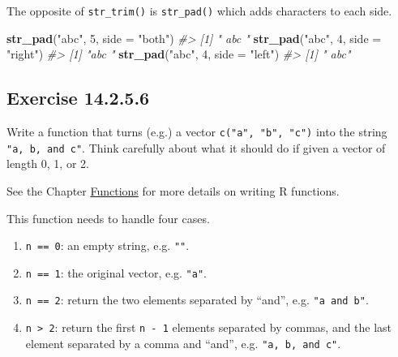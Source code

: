 \documentclass[]{book}
\newenvironment{Shaded}{\begin{snugshade}}{\end{snugshade}}
\newcommand{\CommentTok}[1]{\textcolor[rgb]{0.56,0.35,0.01}{\textit{#1}}}
\newcommand{\DataTypeTok}[1]{\textcolor[rgb]{0.13,0.29,0.53}{#1}}
\newcommand{\DecValTok}[1]{\textcolor[rgb]{0.00,0.00,0.81}{#1}}
\newcommand{\KeywordTok}[1]{\textcolor[rgb]{0.13,0.29,0.53}{\textbf{#1}}}
\newcommand{\NormalTok}[1]{#1}
\newcommand{\StringTok}[1]{\textcolor[rgb]{0.31,0.60,0.02}{#1}}
\providecommand{\tightlist}{%
  \setlength{\itemsep}{0pt}\setlength{\parskip}{0pt}}
\theoremstyle{plain}
\theoremstyle{remark}
\begin{document}
The opposite of \texttt{str\_trim()} is \texttt{str\_pad()} which adds
characters to each side.

\begin{Shaded}
\begin{Highlighting}[]
\KeywordTok{str_pad}\NormalTok{(}\StringTok{"abc"}\NormalTok{, }\DecValTok{5}\NormalTok{, }\DataTypeTok{side =} \StringTok{"both"}\NormalTok{)}
\CommentTok{#> [1] " abc "}
\KeywordTok{str_pad}\NormalTok{(}\StringTok{"abc"}\NormalTok{, }\DecValTok{4}\NormalTok{, }\DataTypeTok{side =} \StringTok{"right"}\NormalTok{)}
\CommentTok{#> [1] "abc "}
\KeywordTok{str_pad}\NormalTok{(}\StringTok{"abc"}\NormalTok{, }\DecValTok{4}\NormalTok{, }\DataTypeTok{side =} \StringTok{"left"}\NormalTok{)}
\CommentTok{#> [1] " abc"}
\end{Highlighting}
\end{Shaded}

\hypertarget{exercise-14.2.5.6}{%
\subsection*{\texorpdfstring{Exercise
{14.2.5.6}}{Exercise 14.2.5.6}}\label{exercise-14.2.5.6}}

Write a function that turns (e.g.) a vector \texttt{c("a",\ "b",\ "c")}
into the string \texttt{"a,\ b,\ and\ c"}. Think carefully about what it
should do if given a vector of length 0, 1, or 2.

See the Chapter \protect\hyperlink{functions}{Functions} for more
details on writing R functions.

This function needs to handle four cases.

\begin{enumerate}
\def\labelenumi{\arabic{enumi}.}
\tightlist
\item
  \texttt{n\ ==\ 0}: an empty string, e.g. \texttt{""}.
\item
  \texttt{n\ ==\ 1}: the original vector, e.g. \texttt{"a"}.
\item
  \texttt{n\ ==\ 2}: return the two elements separated by ``and'', e.g.
  \texttt{"a\ and\ b"}.
\item
  \texttt{n\ \textgreater{}\ 2}: return the first \texttt{n\ -\ 1}
  elements separated by commas, and the last element separated by a
  comma and ``and'', e.g. \texttt{"a,\ b,\ and\ c"}.
\end{enumerate}
\end{document}
